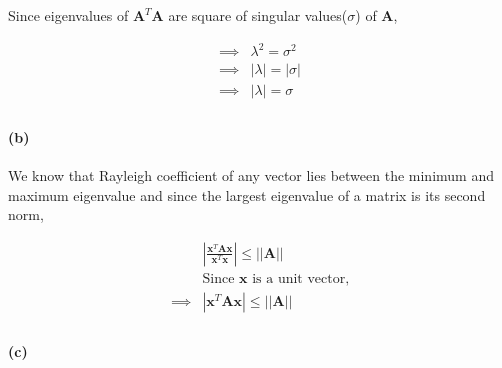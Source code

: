 \documentclass[12pt, letterpaper]{article}
\begin{document}
Since eigenvalues of $\mathbf{A}^T\mathbf{A}$ are square of singular values($\sigma$) of $\mathbf{A}$,

\begin{align*}
  \implies &\lambda^2 = \sigma^2 \\
  \implies &|\lambda| = |\sigma| \\
  \implies &|\lambda| = \sigma \\
\end{align*}

\paragraph{(b)} We know that Rayleigh coefficient of any vector lies between the minimum and maximum eigenvalue and since the largest eigenvalue of a matrix is its second norm,

\begin{align*}
  &\left|\frac{\mathbf{x}^T\mathbf{Ax}}{\mathbf{x}^T\mathbf{x}}\right| \leq ||\mathbf{A}|| \\
  &\text{Since $\mathbf{x}$ is a unit vector,} \\
  \implies &|\mathbf{x}^T\mathbf{Ax}| \leq ||\mathbf{A}|| \\
\end{align*}

\paragraph{(c)}
\end{document}
